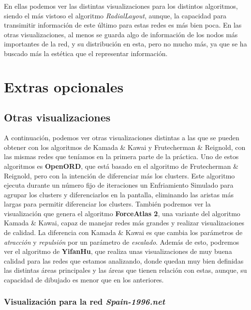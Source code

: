 \documentclass[paper=a4, fontsize=11pt]{article} %
\numberwithin{equation}{section} %
\numberwithin{figure}{section} %
\numberwithin{table}{section} %
\begin{document}
En ellas podemos ver las distintas visualizaciones para los distintos algoritmos, siendo el más vistoso el algoritmo \textit{RadialLayout}, aunque, la capacidad para transimitir información de este último para estas redes es más bien poca. En las otras visualizaciones, al menos se guarda algo de información de los nodos más importantes de la red, y su distribución en esta, pero no mucho más, ya que se ha buscado más la estética que el representar información.

\section{Extras opcionales}

\subsection{Otras visualizaciones}

A continuación, podemos ver otras visualizaciones distintas a las que se pueden obtener con los algoritmos de Kamada \& Kawai y Frutecherman \& Reignold, con las mismas redes que teníamos en la primera parte de la práctica. Uno de estos algoritmos es \textbf{OpenORD}, que está basado en el algoritmo de Frutecherman \& Reignold, pero con la intención de diferenciar más los clusters. Este algoritmo ejecuta durante un número fijo de iteraciones un Enfriamiento Simulado para agrupar los clusters y diferenciarlos en la pantalla, eliminando las aristas más largas para permitir diferenciar los clusters. También podremos ver la visualización que genera el algoritmo \textbf{ForceAtlas 2}, una variante del algoritmo Kamada \& Kawai, capaz de manejar redes más grandes y realizar visualizaciones de calidad. La diferencia con Kamada \& Kawai es que cambia los parámetros de \textit{atracción} y \textit{repulsión} por un parámetro de \textit{escalado}. Además de esto, podremos ver el algoritmo de \textbf{YifanHu}, que realiza unas visualizaciones de muy buena calidad para las redes que estamos analizando, donde quedan muy bien definidas las distintas áreas principales y las áreas que tienen relación con estas, aunque, su capacidad de dibujado es menor que en los anteriores.

\subsubsection{Visualización para la red \textit{Spain-1996.net}}
\end{document}

